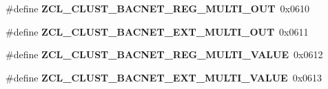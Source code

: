 \begin{DoxyCompactItemize}
\item 
\hypertarget{group__zcl_ga6a07b9b5a340a9e7d07b116a6f0ec722}{\#define {\bfseries Z\-C\-L\-\_\-\-C\-L\-U\-S\-T\-\_\-\-B\-A\-C\-N\-E\-T\-\_\-\-R\-E\-G\-\_\-\-M\-U\-L\-T\-I\-\_\-\-O\-U\-T}~0x0610}\label{group__zcl_ga6a07b9b5a340a9e7d07b116a6f0ec722}

\item 
\hypertarget{group__zcl_ga5db36a6dbe5a242aa6f6adb2dbfd4164}{\#define {\bfseries Z\-C\-L\-\_\-\-C\-L\-U\-S\-T\-\_\-\-B\-A\-C\-N\-E\-T\-\_\-\-E\-X\-T\-\_\-\-M\-U\-L\-T\-I\-\_\-\-O\-U\-T}~0x0611}\label{group__zcl_ga5db36a6dbe5a242aa6f6adb2dbfd4164}

\item 
\hypertarget{group__zcl_ga15f9c19ffa747c96928e35dbb1ae871e}{\#define {\bfseries Z\-C\-L\-\_\-\-C\-L\-U\-S\-T\-\_\-\-B\-A\-C\-N\-E\-T\-\_\-\-R\-E\-G\-\_\-\-M\-U\-L\-T\-I\-\_\-\-V\-A\-L\-U\-E}~0x0612}\label{group__zcl_ga15f9c19ffa747c96928e35dbb1ae871e}

\item 
\hypertarget{group__zcl_ga81f7df07e9322e17d24501a9b7eeb0b6}{\#define {\bfseries Z\-C\-L\-\_\-\-C\-L\-U\-S\-T\-\_\-\-B\-A\-C\-N\-E\-T\-\_\-\-E\-X\-T\-\_\-\-M\-U\-L\-T\-I\-\_\-\-V\-A\-L\-U\-E}~0x0613}\label{group__zcl_ga81f7df07e9322e17d24501a9b7eeb0b6}

\end{DoxyCompactItemize}
\label{_amgrp01747264fe7bf50731df0522c351974e}%
